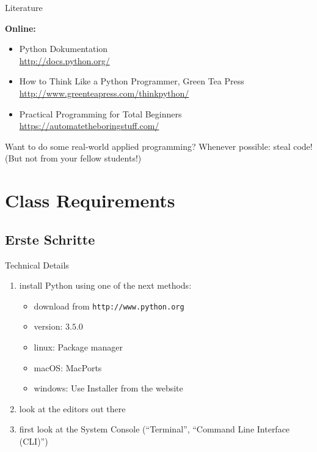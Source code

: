 \documentclass[notes=hide]{beamer}
\begin{document}
\begin{frame}{Literature}

  {\bf Online:}
  \begin{itemize}
    \item Python Dokumentation \\ \url{http://docs.python.org/}
    \item How to Think Like a Python Programmer, Green Tea Press \\
          \url{http://www.greenteapress.com/thinkpython/}
       \item Practical Programming for Total Beginners
       \url{https://automatetheboringstuff.com/}
  \end{itemize}
  
  \begin{block}{Want to do some real-world applied programming?}
    Whenever possible: steal code!\\
    (But not from your fellow students!)
  \end{block}
  \end{frame}

\section{Class Requirements}

\subsection{Erste Schritte}

\begin{frame}{Technical Details}
 \begin{enumerate}
	\item install Python using one of the next methods:
	\begin{itemize}
		\item download from {\tt http://www.python.org}
		\item version: $3.5.0$
		\item linux: Package manager
		\item macOS: MacPorts
		\item windows: Use Installer from the website
	\end{itemize}
	\item look at the editors out there
	\item first look at the System Console (``Terminal'', ``Command Line Interface (CLI)'')
 \end{enumerate}
\end{frame}
\end{document}
